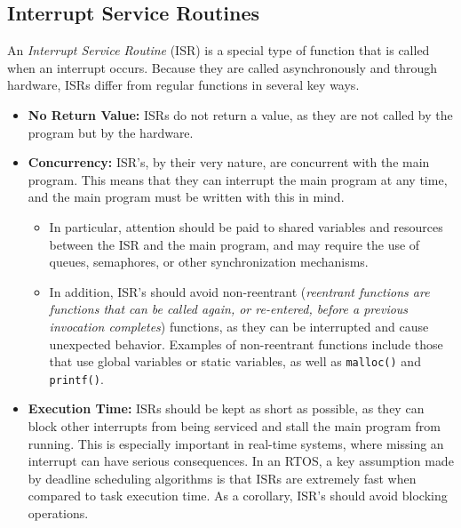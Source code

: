 \documentclass[main.tex]{subfiles}
\begin{document}
\subsection{Interrupt Service Routines}
An \textit{Interrupt Service Routine} (ISR) is a special type of function that is called when an interrupt occurs. Because they are called asynchronously and through hardware, ISRs differ from regular functions in several key ways.
\begin{itemize}
    \item \textbf{No Return Value:} ISRs do not return a value, as they are not called by the program but by the hardware.
    \item \textbf{Concurrency:} ISR's, by their very nature, are concurrent with the main program. This means that they can interrupt the main program at any time, and the main program must be written with this in mind. 
    \begin{itemize} 
        \item In particular, attention should be paid to shared variables and resources between the ISR and the main program, and may require the use of queues, semaphores, or other synchronization mechanisms.
        \item In addition, ISR's should avoid non-reentrant (\textit{reentrant functions are functions that can be called again, or re-entered, before a previous invocation completes}) functions, as they can be interrupted and cause unexpected behavior. Examples of non-reentrant functions include those that use global variables or static variables, as well as \texttt{malloc()} and \texttt{printf()}.
    \end{itemize}
    \item \textbf{Execution Time:} ISRs should be kept as short as possible, as they can block other interrupts from being serviced and stall the main program from running. This is especially important in real-time systems, where missing an interrupt can have serious consequences. In an RTOS, a key assumption made by deadline scheduling algorithms is that ISRs are extremely fast when compared to task execution time. As a corollary, ISR's should avoid blocking operations.
\end{itemize}
\end{document}
